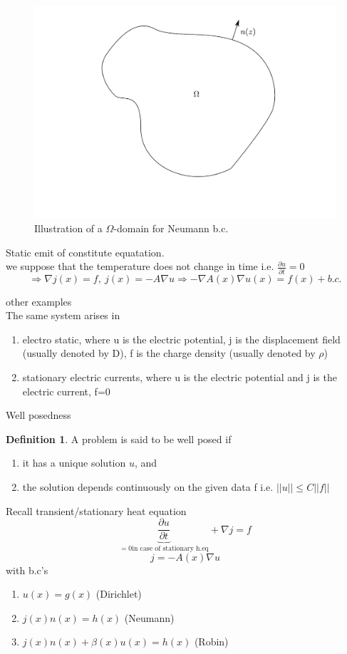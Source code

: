 \documentclass[english]{article}
\theoremstyle{definition}
\newtheorem*{defi}{Definition}
\theoremstyle{remark}
\newcommand{\f}[2]{\frac{#1}{#2}}							%
\newcommand{\p}{\partial}
\newcommand{\bb}{\beta}					%
\newcommand{\drw}{\Rightarrow}			%
\newcommand{\tri}{\nabla}
\newcommand{\tx}[1]{\text{#1}}
\begin{document}
\begin{figure}[H]
  \begin{center}
    \includegraphics[width=\textwidth]{figs/OmegaDomain.pdf}
  \end{center}
  \caption{Illustration of a $\Omega$-domain for Neumann b.c.}
  \label{omega-domain-figure}
\end{figure}

Static emit of constitute equatation.\\
we suppose that the temperature does not change in time i.e. $\f{\p u}{\p t}=0$
$$\drw \tri j(x) = f,\ j(x)=-A \tri u \drw -\tri A(x)\tri u(x) = f(x) + b.c.$$


other examples\\
The same system arises in 
\begin{enumerate}
\item electro static, where u is the electric potential, j is the displacement field (usually denoted by D), f is the charge density (usually denoted by $\rho$)
\item stationary electric currents, where u is the electric potential and j is the electric current, f=0
\end{enumerate}
Well posedness\\
\begin{defi} A problem is said to be well posed if 
  \begin{enumerate}
  \item it has a unique solution $u$, and
  \item the solution depends continuously on the given data f i.e. $||u||\leq C ||f||$
  \end{enumerate}
\end{defi}
Recall transient/stationary heat equation
$$\underbrace{\f{\p u}{\p t}}_{=0 \tx{in case of stationary h.eq}}+ \nabla j = f$$
$$j= -A(x)\nabla u$$
with b.c's
\begin{enumerate}
\item $u(x) = g(x)$ (Dirichlet)
\item $j(x) n(x) = h(x) $ (Neumann)
\item $j(x)n(x) + \bb (x) u(x) = h(x) $ (Robin)
\end{enumerate}
\end{document}
